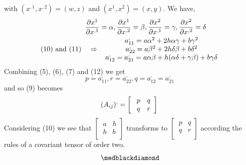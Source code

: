 with $(x^{,1},x^{,2}) = (w, z)$ and $(x^{1},x^{2}) = (x, y)$. We have,
\begin{align}
\ \pdv{x^1}{x^{,1}} &= \alpha, \pdv{x^1}{x^{,2}} = \beta,\pdv{x^2}{x^{,1}} = \gamma,\pdv{x^2}{x^{,2}} = \delta\\
\text{ (10) and (11)}\quad \Rightarrow\ &\begin{array}{c}
  \ a^{,}_{11} = a \alpha^2 + 2 h \alpha \gamma + b \gamma^2 \\
  \ a^{,}_{22} = a \beta^2 + 2 h \delta \beta + b \delta^2 \\
  \ a^{,}_{12} = a^{,}_{21} =a \alpha \beta + h( \alpha \delta + \gamma \beta) + b \gamma \delta \\
  \end{array}
\end{align}
Combining (5), (6), (7) and (12) we get $$ p = a^{,}_{11}, r = a^{,}_{22}, q =  a^{,}_{12} = a^{,}_{21}$$ and so (9) becomes $$  (A_{ij})^{,} = \left[ { \begin{array}{cc}
  \ p &  q\\
  \ q  & r\\
  \end{array}} \right] \\$$
Considering (10) we see that $\left[ { \begin{array}{cc}
  \ a &  h\\
  \ h   &b\\
  \end{array}} \right] $ transforms to $\left[ { \begin{array}{cc}
  \ p &  q\\
  \ q  & r\\
  \end{array}} \right]$ according the rules of a covariant tensor of order two.
$$\medblackdiamond$$
\pagebreak[4]

